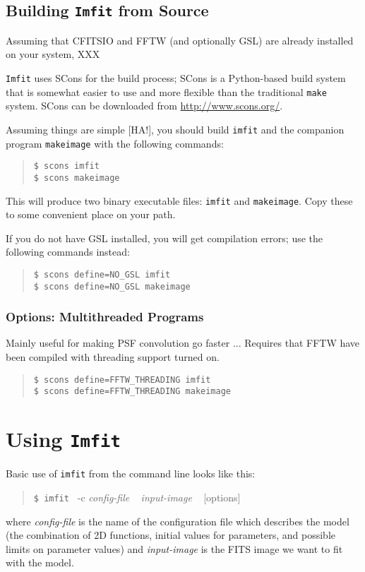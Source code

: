 \documentclass[10pt]{article}
\newcommand{\imfit}{\texttt{imfit}}
\newcommand{\Imfit}{\texttt{Imfit}}
\newcommand{\makeimage}{\texttt{makeimage}}
\begin{document}
\subsection{Building \Imfit{} from Source}

Assuming that CFITSIO and FFTW (and optionally GSL) are already installed
on your system, XXX

\Imfit{} uses SCons for the build process; SCons is a Python-based build system
that is somewhat easier to use and more flexible than the traditional \texttt{make}
system. SCons can be downloaded from \url{http://www.scons.org/}.

Assuming things are simple [HA!], you should build \imfit{} and the companion
program \makeimage{} with the following commands:
\begin{quote}
\texttt{\$ scons imfit} \\
\texttt{\$ scons makeimage}
\end{quote}
This will produce two binary executable files: \imfit{} and \makeimage{}. Copy
these to some convenient place on your path.

If you do not have GSL installed, you will get compilation errors; use the following
commands instead:
\begin{quote}
\texttt{\$ scons define=NO\_GSL imfit} \\
\texttt{\$ scons define=NO\_GSL makeimage}
\end{quote}

\subsubsection{Options: Multithreaded Programs}

Mainly useful for making PSF convolution go faster ... Requires that FFTW
have been compiled with threading support turned on.

\begin{quote}
\texttt{\$ scons define=FFTW\_THREADING imfit} \\
\texttt{\$ scons define=FFTW\_THREADING makeimage}
\end{quote}





\section{Using \Imfit{}}

Basic use of \imfit{} from the command line looks like this:
\begin{quote}
  \texttt{\$ \imfit{} }  -c \textit{config-file} ~ \textit{input-image} ~ [options]
\end{quote}
where \textit{config-file} is the name of the configuration file
which describes the model (the combination of 2D functions, initial values
for parameters, and possible limits on parameter values) and \textit{input-image}
is the FITS image we want to fit with the model.
\end{document}
